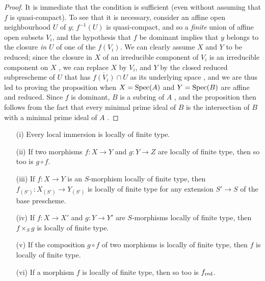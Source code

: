 \begin{proof}
It is immediate that the condition is sufficient (even without assuming that $f$ is quasi-compact).
To see that it is necessary, consider an affine open neighbourhood $U$ of $y$;
$f^{-1}(U)$ is quasi-compact, and so a \emph{finite} union of affine open subsets $V_i$, and the hypothesis that $f$ be dominant implies that $y$ belongs to the closure \emph{in $U$} of one of the $f(V_i)$.
We can clearly assume $X$ and $Y$ to be reduced;
since the closure in $X$ of an irreducible component of $V_i$ is an irreducible component on $X$ , we can replace $X$ by $V_i$, and $Y$ by the closed reduced subprescheme of $U$ that has $\overline{f(V_i)}\cap U$ as its underlying space , and we are thus led to proving the proposition when $X=\operatorname{Spec}(A)$ and $Y=\operatorname{Spec}(B)$ are affine and reduced.
Since $f$ is dominant, $B$ is a subring of $A$ , and the proposition then follows from the fact that every minimal prime ideal of $B$ is the intersection of $B$ with a minimal prime ideal of $A$ .
\end{proof}

\begin{proposition}[6.6.6]
\label{I.6.6.6}
\medskip\noindent
\begin{enumerate}
  \item[{\rm(i)}] Every local immersion is locally of finite type.
  \item[{\rm(ii)}] If two morphisms $f:X\to Y$ and $g:Y\to Z$ are locally of finite type, then so too is $g\circ f$.
  \item[{\rm(iii)}] If $f:X\to Y$ is an $S$-morphism locally of finite type, then $f_{(S')}:X_{(S')}\to Y_{(S')}$ is locally of finite type for any extension $S'\to S$ of the base prescheme.
  \item[{\rm(iv)}] If $f:X\to X'$ and $g:Y\to Y'$ are $S$-morphisms locally of finite type, then $f\times_S g$ is locally of finite type.
  \item[{\rm(v)}] If the composition $g\circ f$ of two morphisms is locally of finite type, then $f$ is locally of finite type.
  \item[{\rm(vi)}] If a morphism $f$ is locally of finite type, then so too is $f_{\mathrm{red}}$.
\end{enumerate}
\end{proposition}

